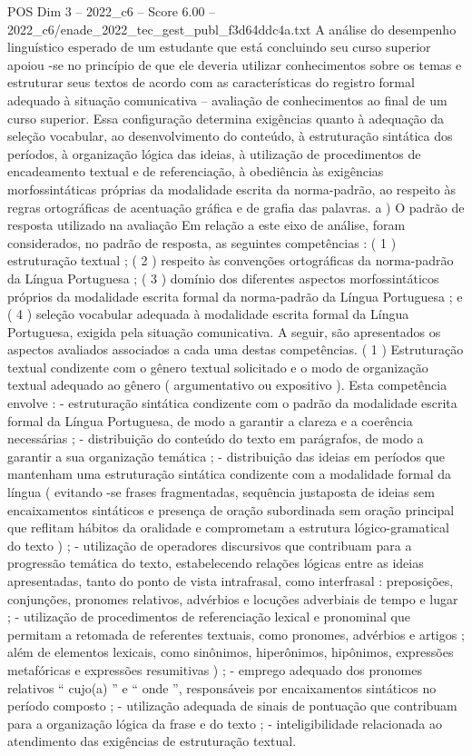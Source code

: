 \begin{textsample}{POS Dim 3 – 2022\_c6 – Score 6.00 – 2022\_c6/enade\_2022\_tec\_gest\_publ\_f3d64ddc4a.txt}
A análise do desempenho linguístico esperado de um estudante que está concluindo seu curso superior apoiou -se no princípio de que ele deveria utilizar conhecimentos sobre os temas e estruturar seus textos de acordo com as características do registro formal adequado à situação comunicativa – avaliação de conhecimentos ao final de um curso superior.
Essa configuração determina exigências quanto à adequação da seleção vocabular, ao desenvolvimento do conteúdo, à estruturação sintática dos períodos, à organização lógica das ideias, à utilização de procedimentos de encadeamento textual e de referenciação, à obediência às exigências morfossintáticas próprias da modalidade escrita da norma-padrão, ao respeito às regras ortográficas de acentuação gráfica e de grafia das palavras. a ) O padrão de resposta utilizado na avaliação Em relação a este eixo de análise, foram considerados, no padrão de resposta, as seguintes competências : ( 1 ) estruturação textual ; ( 2 ) respeito às convenções ortográficas da norma-padrão da Língua Portuguesa ; ( 3 ) domínio dos diferentes aspectos morfossintáticos próprios da modalidade escrita formal da norma-padrão da Língua Portuguesa ; e ( 4 ) seleção vocabular adequada à modalidade escrita formal da Língua Portuguesa, exigida pela situação comunicativa.
A seguir, são apresentados os aspectos avaliados associados a cada uma destas competências. ( 1 ) Estruturação textual condizente com o gênero textual solicitado e o modo de organização textual adequado ao gênero ( argumentativo ou expositivo ).
Esta competência envolve : - estruturação sintática condizente com o padrão da modalidade escrita formal da Língua Portuguesa, de modo a garantir a clareza e a coerência necessárias ; - distribuição do conteúdo do texto em parágrafos, de modo a garantir a sua organização temática ; - distribuição das ideias em períodos que mantenham uma estruturação sintática condizente com a modalidade formal da língua ( evitando -se frases fragmentadas, sequência justaposta de ideias sem encaixamentos sintáticos e presença de oração subordinada sem oração principal que reflitam hábitos da oralidade e comprometam a estrutura lógico-gramatical do texto ) ; - utilização de operadores discursivos que contribuam para a progressão temática do texto, estabelecendo relações lógicas entre as ideias apresentadas, tanto do ponto de vista intrafrasal, como interfrasal : preposições, conjunções, pronomes relativos, advérbios e locuções adverbiais de tempo e lugar ; - utilização de procedimentos de referenciação lexical e pronominal que permitam a retomada de referentes textuais, como pronomes, advérbios e artigos ; além de elementos lexicais, como sinônimos, hiperônimos, hipônimos, expressões metafóricas e expressões resumitivas ) ; - emprego adequado dos pronomes relativos “ cujo(a) ” e “ onde ”, responsáveis por encaixamentos sintáticos no período composto ; - utilização adequada de sinais de pontuação que contribuam para a organização lógica da frase e do texto ; - inteligibilidade relacionada ao atendimento das exigências de estruturação textual.

\end{textsample}
